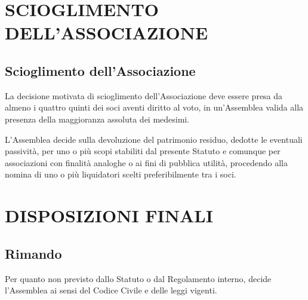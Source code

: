 \documentclass[a4paper,11pt,oneside]{article}
\begin{document}
\section{SCIOGLIMENTO DELL'ASSOCIAZIONE}

\subsection{Scioglimento dell'Associazione}
La decisione motivata di scioglimento dell'Associazione deve essere presa da almeno i quattro quinti dei soci aventi diritto al voto, in un'Assemblea valida alla presenza della maggioranza assoluta dei medesimi.

L'Assemblea decide sulla devoluzione del patrimonio residuo, dedotte le eventuali passività, per uno o più scopi stabiliti dal presente Statuto e comunque per associazioni con finalità analoghe o ai fini di pubblica utilità, procedendo alla nomina di uno o più liquidatori scelti preferibilmente tra i soci.

\section{DISPOSIZIONI FINALI}

\subsection{Rimando}
Per quanto non previsto dallo Statuto o dal Regolamento interno, decide l'Assemblea ai sensi del Codice Civile e delle leggi vigenti.
\end{document}
